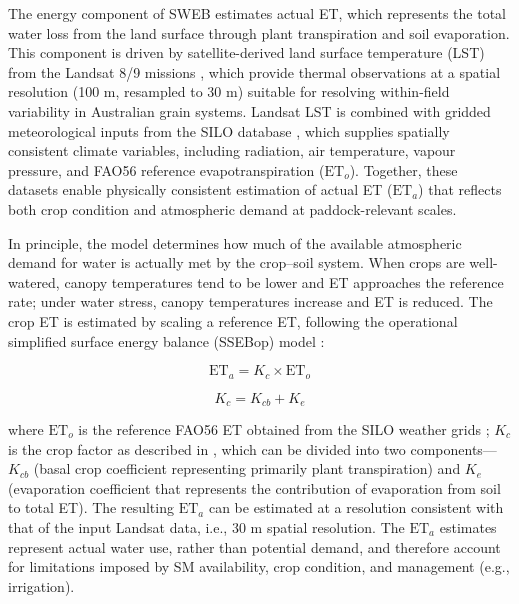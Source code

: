 \documentclass[11pt,a4paper]{article}
\begin{document}
The energy component of SWEB estimates actual ET, which represents the total water loss from the land surface through plant transpiration and soil evaporation. This component is driven by satellite-derived land surface temperature (LST) from the Landsat 8/9 missions \citep{irons_next_2012,roy_next_2026}, which provide thermal observations at a spatial resolution (100 m, resampled to 30 m) suitable for resolving within-field variability in Australian grain systems. Landsat LST is combined with gridded meteorological inputs from the SILO database \citep{jeffrey_using_2001}, which supplies spatially consistent climate variables, including radiation, air temperature, vapour pressure, and FAO56 reference evapotranspiration ($\mathrm{ET}_{o}$). Together, these datasets enable physically consistent estimation of actual ET ($\mathrm{ET}_{a}$) that reflects both crop condition and atmospheric demand at paddock-relevant scales.

In principle, the model determines how much of the available atmospheric demand for water is actually met by the crop--soil system. When crops are well-watered, canopy temperatures tend to be lower and ET approaches the reference rate; under water stress, canopy temperatures increase and ET is reduced. The crop ET is estimated by scaling a reference ET, following the operational simplified surface energy balance (SSEBop) model \citep{senay_mapping_2022,senay_operational_2013}:

\begin{equation*}
\mathrm{ET}_{a} = K_{c} \times \mathrm{ET}_{o}
\tag{1}
\end{equation*}

\begin{equation*}
K_{c} = K_{cb} + K_{e}
\tag{2}
\end{equation*}

where $\mathrm{ET}_{o}$ is the reference FAO56 ET obtained from the SILO weather grids \citep{jeffrey_using_2001}; $K_{c}$ is the crop factor as described in \citet{allen_crop_1998}, which can be divided into two components---$K_{cb}$ (basal crop coefficient representing primarily plant transpiration) and $K_{e}$ (evaporation coefficient that represents the contribution of evaporation from soil to total ET). The resulting $\mathrm{ET}_{a}$ can be estimated at a resolution consistent with that of the input Landsat data, i.e., 30 m spatial resolution. The $\mathrm{ET}_{a}$ estimates represent actual water use, rather than potential demand, and therefore account for limitations imposed by SM availability, crop condition, and management (e.g., irrigation).
\end{document}
